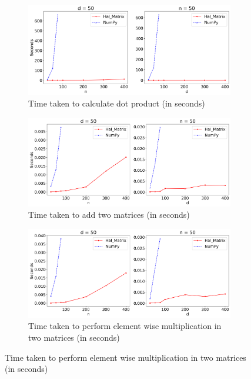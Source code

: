 \documentclass[11pt,twocolumn]{article}
\begin{document}
\begin{figure}[h]
    \centering
    \begin{subfigure}{0.45\textwidth}
        \includegraphics[width=\linewidth]{graphs/dot2.png}
        \caption{Time taken to calculate dot product (in seconds)}
        \label{img:dot}
    \end{subfigure}
    \begin{subfigure}{0.45\textwidth}
        \includegraphics[width=\linewidth]{graphs/add2.png}
        \caption{Time taken to add two matrices (in seconds)}
        \label{img:add}
    \end{subfigure}
    \begin{subfigure}{0.45\textwidth}
        \includegraphics[width=\linewidth]{graphs/mul2.png}
        \caption{Time taken to perform element wise multiplication in two matrices (in seconds)}

\end{subfigure}
\end{figure}
\end{document}
